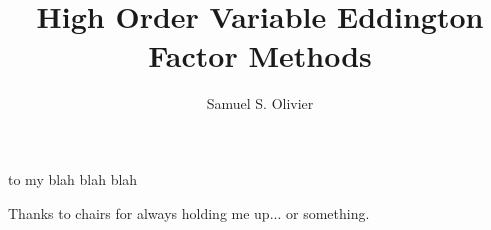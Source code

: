 \documentclass{ucbthesis}
\begin{document}
\title{High Order Variable Eddington Factor Methods}
\author{Samuel S. Olivier}
\othermembers{}

\maketitle
\approvalpage
\copyrightpage

\begin{frontmatter}
\begin{dedication}
to my blah blah blah 
\end{dedication}


\begin{acknowledgements}
Thanks to chairs for always holding me up... or something. 
\end{acknowledgements}
\end{frontmatter}

\pagestyle{headings}

\printbibliography
\end{document}
